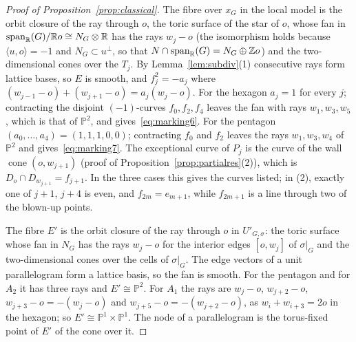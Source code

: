 \begin{proof}[Proof of Proposition~\ref{prop:classical}]
The fibre over $x_G$ in the local model is the orbit closure of the ray through $o$, the toric surface of the star of $o$,
whose fan in $\operatorname{span}_\mathbb R(G)/\mathbb R o\cong N_G\otimes\mathbb R$ has the rays $w_j-o$ (the isomorphism holds
because $\langle u,o\rangle=-1$ and $N_G\subset u^\perp$, so that $N\cap\operatorname{span}_\mathbb R(G)=N_G\oplus\mathbb Z o$) and the two-dimensional cones over the $T_j$. By
Lemma~\ref{lem:subdiv}(1) consecutive rays form lattice bases, so $E$ is smooth, and $f_j^2=-a_j$ where
$(w_{j-1}-o)+(w_{j+1}-o)=a_j(w_j-o)$. For the hexagon $a_j=1$ for every $j$; contracting the disjoint $(-1)$-curves $f_0,f_2,f_4$
leaves the fan with rays $w_1,w_3,w_5$, which is that of $\mathbb P^2$, and gives~\eqref{eq:marking6}. For the pentagon
$(a_0,\dots,a_4)=(1,1,1,0,0)$; contracting $f_0$ and $f_2$ leaves the rays $w_1,w_3,w_4$ of $\mathbb P^2$ and
gives~\eqref{eq:marking7}. The exceptional curve of $P_j$ is the curve of the wall $\operatorname{cone}(o,w_{j+1})$ (proof of
Proposition~\ref{prop:partialres}(2)), which is $D_o\cap D_{w_{j+1}}=f_{j+1}$. In the three cases this gives the curves
listed; in (2), exactly one of $j+1$, $j+4$ is even, and $f_{2m}=e_{m+1}$, while $f_{2m+1}$ is a line through two of the
blown-up points.

The fibre $E'$ is the orbit closure of the ray through $o$ in $U'_{G,\sigma}$: the toric surface whose fan in $N_G$ has the
rays $w_j-o$ for the interior edges $[o,w_j]$ of $\sigma|_G$ and the two-dimensional cones over the cells of $\sigma|_G$. The
edge vectors of a unit parallelogram form a lattice basis, so the fan is smooth. For the pentagon and for $A_2$ it has three
rays and $E'\cong\mathbb P^2$. For $A_1$ the rays are $w_j-o$, $w_{j+2}-o$, $w_{j+3}-o=-(w_j-o)$ and $w_{j+5}-o=-(w_{j+2}-o)$, as
$w_i+w_{i+3}=2o$ in the hexagon; so $E'\cong\mathbb P^1\times\mathbb P^1$. The node of a parallelogram is the torus-fixed point
of $E'$ of the cone over it.
\end{proof}
